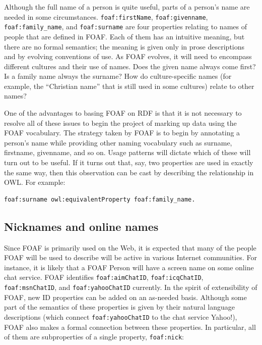 Although the full name of a person is quite useful, parts of a person's
name are needed in some circumstances. \texttt{foaf:firstName}, \texttt{foaf:givenname},
\texttt{foaf:family\_name}, and \texttt{foaf:surname} are four properties relating to
names of people that are defined in FOAF. Each of
them has an intuitive meaning, but there are no formal semantics; the
meaning is given only in prose descriptions and by evolving conventions
of use. As FOAF evolves, it will need to encompass different cultures
and their use of names. Does the given name always come first? Is a
family name always the surname? How do culture-specific names (for
example, the ``Christian name'' that is still used in some cultures)
relate to other names?

One of the advantages to basing FOAF on RDF is that it is not necessary
to resolve all of these issues to begin the project of marking up data
using the FOAF vocabulary. The strategy taken by FOAF is to begin by
annotating a person's name while providing other naming vocabulary such
as surname, firstname, givenname, and so on. Usage patterns will dictate
which of these will turn out to be useful. If it turns out that, say,
two properties are used in exactly the same way, then this observation
can be cast by describing the relationship in OWL. For example:

\begin{lstlisting}
foaf:surname owl:equivalentProperty foaf:family_name.
\end{lstlisting}

\subsection{Nicknames and online names}

Since FOAF is primarily used on the Web, it is expected that many of the
people FOAF will be used to describe will be active in various Internet
communities. For instance, it is likely that a FOAF Person will have a
screen name on some online chat service. FOAF identifies \texttt{foaf:aimChatID},
\texttt{foaf:icqChatID}, \texttt{foaf:msnChatID}, and \texttt{foaf:yahooChatID} currently. In the
spirit of extensibility of FOAF, new ID properties can be added on an
as-needed basis. Although some part of the semantics of these properties
is given by their natural language descriptions (which connect
\texttt{foaf:yahooChatID} to the chat service Yahoo!), FOAF also makes a formal
connection between these properties. In particular, all of them are
subproperties of a single property, \texttt{foaf:nick}:

